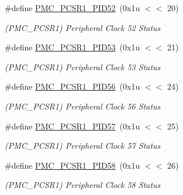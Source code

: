 \begin{DoxyCompactItemize}
\mbox{\label{group__SAMV71__PMC_ga90e469e8c4092e40cf840c357a234820}} 
\#define \mbox{\hyperlink{group__SAMV71__PMC_ga90e469e8c4092e40cf840c357a234820}{P\+M\+C\+\_\+\+P\+C\+S\+R1\+\_\+\+P\+I\+D52}}~(0x1u $<$$<$ 20)
\begin{DoxyCompactList}\small\item\em (P\+M\+C\+\_\+\+P\+C\+S\+R1) Peripheral Clock 52 Status \end{DoxyCompactList}\item 
\mbox{\label{group__SAMV71__PMC_ga428a2719b7cbbd3adf3df7ba2758c588}} 
\#define \mbox{\hyperlink{group__SAMV71__PMC_ga428a2719b7cbbd3adf3df7ba2758c588}{P\+M\+C\+\_\+\+P\+C\+S\+R1\+\_\+\+P\+I\+D53}}~(0x1u $<$$<$ 21)
\begin{DoxyCompactList}\small\item\em (P\+M\+C\+\_\+\+P\+C\+S\+R1) Peripheral Clock 53 Status \end{DoxyCompactList}\item 
\mbox{\label{group__SAMV71__PMC_ga69d2ba5a72f50a7184e1c458c346dfc0}} 
\#define \mbox{\hyperlink{group__SAMV71__PMC_ga69d2ba5a72f50a7184e1c458c346dfc0}{P\+M\+C\+\_\+\+P\+C\+S\+R1\+\_\+\+P\+I\+D56}}~(0x1u $<$$<$ 24)
\begin{DoxyCompactList}\small\item\em (P\+M\+C\+\_\+\+P\+C\+S\+R1) Peripheral Clock 56 Status \end{DoxyCompactList}\item 
\mbox{\label{group__SAMV71__PMC_ga4c7b80912e938e0ce323d8761712eac5}} 
\#define \mbox{\hyperlink{group__SAMV71__PMC_ga4c7b80912e938e0ce323d8761712eac5}{P\+M\+C\+\_\+\+P\+C\+S\+R1\+\_\+\+P\+I\+D57}}~(0x1u $<$$<$ 25)
\begin{DoxyCompactList}\small\item\em (P\+M\+C\+\_\+\+P\+C\+S\+R1) Peripheral Clock 57 Status \end{DoxyCompactList}\item 
\mbox{\label{group__SAMV71__PMC_gaddd97f663c080afc67880dba2e8fb242}} 
\#define \mbox{\hyperlink{group__SAMV71__PMC_gaddd97f663c080afc67880dba2e8fb242}{P\+M\+C\+\_\+\+P\+C\+S\+R1\+\_\+\+P\+I\+D58}}~(0x1u $<$$<$ 26)
\begin{DoxyCompactList}\small\item\em (P\+M\+C\+\_\+\+P\+C\+S\+R1) Peripheral Clock 58 Status \end{DoxyCompactList}\item 
$$
\end{DoxyCompactItemize}
